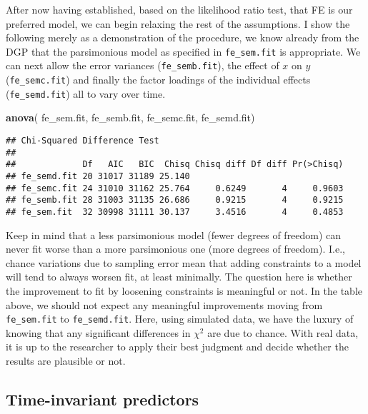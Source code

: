 \documentclass[]{interact}
\theoremstyle{plain}%
\theoremstyle{definition}
\theoremstyle{remark}
\newenvironment{Shaded}{\begin{snugshade}}{\end{snugshade}}
\newcommand{\KeywordTok}[1]{\textcolor[rgb]{0.13,0.29,0.53}{\textbf{#1}}}
\newcommand{\NormalTok}[1]{#1}
\begin{document}
After now having established, based on the likelihood ratio test, that
FE is our preferred model, we can begin relaxing the rest of the
assumptions. I show the following merely as a demonstration of the
procedure, we know already from the DGP that the parsimonious model as
specified in \texttt{fe\_sem.fit} is appropriate. We can next allow the
error variances (\texttt{fe\_semb.fit}), the effect of \(x\) on \(y\)
(\texttt{fe\_semc.fit}) and finally the factor loadings of the
individual effects (\texttt{fe\_semd.fit}) all to vary over time.

\singlespacing

\doublespacing

\small
\singlespacing

\begin{Shaded}
\begin{Highlighting}[]
\KeywordTok{anova}\NormalTok{( fe\_sem.fit, fe\_semb.fit, fe\_semc.fit, fe\_semd.fit)}
\end{Highlighting}
\end{Shaded}

\begin{verbatim}
## Chi-Squared Difference Test
## 
##             Df   AIC   BIC  Chisq Chisq diff Df diff Pr(>Chisq)
## fe_semd.fit 20 31017 31189 25.140                              
## fe_semc.fit 24 31010 31162 25.764     0.6249       4     0.9603
## fe_semb.fit 28 31003 31135 26.686     0.9215       4     0.9215
## fe_sem.fit  32 30998 31111 30.137     3.4516       4     0.4853
\end{verbatim}

\doublespacing
\normalsize

Keep in mind that a less parsimonious model (fewer degrees of freedom)
can never fit worse than a more parsimonious one (more degrees of
freedom). I.e., chance variations due to sampling error mean that adding
constraints to a model will tend to always worsen fit, at least
minimally. The question here is whether the improvement to fit by
loosening constraints is meaningful or not. In the table above, we
should not expect any meaningful improvements moving from
\texttt{fe\_sem.fit} to \texttt{fe\_semd.fit}. Here, using simulated
data, we have the luxury of knowing that any significant differences in
\(\chi^{2}\) are due to chance. With real data, it is up to the
researcher to apply their best judgment and decide whether the results
are plausible or not.

\hypertarget{time-invariant}{%
\subsection{Time-invariant predictors}\label{time-invariant}}
\end{document}
